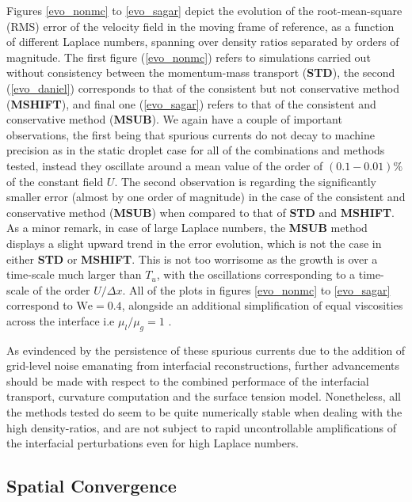 Figures \ref{evo_nonmc} to \ref{evo_sagar} depict the evolution of the root-mean-square (RMS) error of the velocity field in the moving frame of reference, as a function of different Laplace numbers, spanning over density ratios separated by orders of magnitude. The first figure (\ref{evo_nonmc}) refers to simulations carried out without consistency between the momentum-mass transport (\textbf{STD}), the second (\ref{evo_daniel}) corresponds to that of the consistent but not conservative method (\textbf{MSHIFT}), and final one (\ref{evo_sagar}) refers to that of the consistent and conservative method (\textbf{MSUB}). We again have a couple of important observations, the first being that spurious currents do not decay to machine precision as in the static droplet case for all of the combinations and methods tested, instead they oscillate around a mean value of the order of $(0.1-0.01)\% $ of the constant field $U$. The second observation is regarding the significantly smaller error (almost by one order of magnitude) in the case of the consistent and conservative method (\textbf{MSUB}) when compared to that of \textbf{STD} and \textbf{MSHIFT}. As a minor remark, in case of large Laplace numbers, the \textbf{MSUB} method displays a slight upward trend in the error evolution, which is not the case in either \textbf{STD} or \textbf{MSHIFT}. This is not too worrisome as the growth is over a time-scale much larger than $T_u$, with the oscillations corresponding to a time-scale of the order $U/\Delta x$. All of the plots in figures \ref{evo_nonmc} to \ref{evo_sagar} correspond to $\textrm{We} = 0.4$, alongside an additional simplification of equal viscosities across the interface i.e $\mu_l/\mu_g = 1$ .

As evindenced by the persistence of these spurious currents due to the addition of grid-level noise emanating from interfacial reconstructions, further advancements should be made with respect to the combined performace of the interfacial transport, curvature computation and the surface tension model. Nonetheless, all the methods tested do seem to be quite numerically stable when dealing with the high density-ratios, and are not subject to rapid uncontrollable amplifications of the interfacial perturbations even for high Laplace numbers.

\subsection*{Spatial Convergence}

